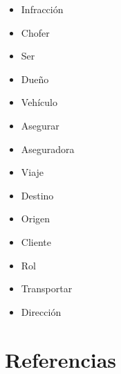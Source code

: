 \documentclass{article}
\begin{document}
\begin{itemize}
\item Infracción\\
\item Chofer\\
\item Ser\\
\item Dueño\\
\item Vehículo\\
\item Asegurar\\
\item Aseguradora\\
\item Viaje\\
\item Destino\\
\item Origen\\
\item Cliente\\
\item Rol\\
\item Transportar\\
\item Dirección\\

\end{itemize}




\section{Referencias}
\end{document}
